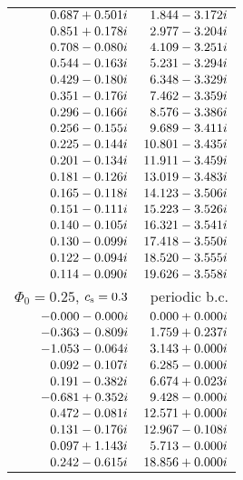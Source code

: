 \documentclass[useAMS,usenatbib]{mn2e}
\begin{document}
\begin {table}
\begin{center}
\begin{tabular}{r r}
    $0.687  + 0.501i$ 	&  $1.844  - 3.172i$ \\
    $0.851  + 0.178i$ 	&  $2.977  - 3.204i$ \\
    $0.708  - 0.080i $	&  $4.109  - 3.251i$ \\
    $0.544  - 0.163i $	&  $5.231  - 3.294i$ \\
    $0.429  - 0.180i $	&  $6.348  - 3.329i$ \\
    $0.351  - 0.176i $	&  $7.462  - 3.359i$ \\
    $0.296  - 0.166i $	&  $8.576  - 3.386i$ \\
    $0.256  - 0.155i $	&  $9.689  - 3.411i$ \\
    $0.225  - 0.144i $	&  $10.801  - 3.435i$ \\
    $0.201  - 0.134i $	&  $11.911  - 3.459i$ \\
    $0.181  - 0.126i $	&  $13.019  - 3.483i$ \\
    $0.165  - 0.118i $	&  $14.123  - 3.506i$ \\
    $0.151  - 0.111i $	&  $15.223  - 3.526i$ \\
    $0.140  - 0.105i $	&  $16.321  - 3.541i$ \\
    $0.130  - 0.099i $	&  $17.418  - 3.550i$ \\
    $0.122  - 0.094i $	&  $18.520  - 3.555i$ \\
    $0.114  - 0.090i $	&  $19.626  - 3.558i$ \\
    \hline
    $\Phi_0 =0.25$, $c_{\rm s}=0.3$ &  periodic b.c. \\
    \hline
    $- 0.000 - 0.000i$	& $0.000 + 0.000i$ \\
    $- 0.363  - 0.809i$ 	&  $1.759 + 0.237i$ \\
    $- 1.053  - 0.064i$	&  $3.143  + 0.000i$ \\
    $ 0.092  - 0.107i$ 	&  $6.285  - 0.000i$ \\
    $ 0.191  - 0.382i$ 	&  $6.674  + 0.023i$ \\
    $- 0.681  + 0.352i$ 	&  $9.428  - 0.000i$ \\
    $ 0.472  - 0.081i$ 	&  $12.571  + 0.000i$ \\
    $ 0.131  - 0.176i$ 	&  $12.967  - 0.108i$ \\
    $ 0.097  + 1.143i$ 	&  $5.713  - 0.000i$ \\
    $ 0.242  - 0.615i$	&  $18.856  + 0.000i$ \\

\end{tabular}
\end{center}
\end{table}
\end{document}
